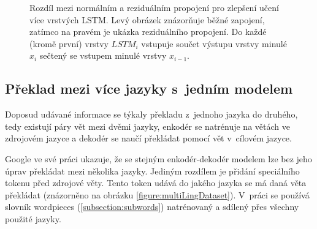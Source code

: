 \begin{figure}[H]
    \begin{center}
    \end{center}
	\caption{Rozdíl mezi normálním a reziduálním propojení pro zlepšení učení více vrstvých LSTM. Levý obrázek znázorňuje běžné zapojení, zatímco na pravém je ukázka reziduálního propojení. Do každé (kromě první) vrstvy $LSTM_i$ vstupuje součet výstupu vrstvy minulé $x_i$ sečtený se vstupem minulé vrstvy $x_{i-1}$.}
	\label{img:residuals}
\end{figure}


\subsection{Překlad mezi více jazyky s~jedním modelem} \label{section:multilingual}
Doposud udávané informace se týkaly překladu z~jednoho jazyka do druhého, tedy existují páry vět mezi dvěmi jazyky, enkodér se natrénuje na větách ve zdrojovém jazyce a dekodér se naučí překládat pomocí vět v~cílovém jazyce.

Google ve své práci \cite{googleMultiLingual} ukazuje, že se stejným enkodér-dekodér modelem lze bez jeho úprav překládat mezi několika jazyky.
Jediným rozdílem je přidání speciálního tokenu před zdrojové věty. Tento token udává do jakého jazyka se má daná věta překládat (znázorněno na obrázku \ref{figure:multiLingDataset}). V~práci se používá slovník wordpieces (\ref{subsection:subwords}) natrénovaný a sdílený přes všechny použité jazyky.


